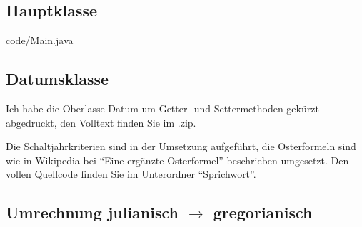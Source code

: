 \subsection{Hauptklasse}
 {code/Main.java}
\clearpage
\subsection{Datumsklasse}
Ich habe die Oberlasse Datum um Getter- und Settermethoden gekürzt abgedruckt, den Volltext finden Sie im .zip.



Die Schaltjahrkriterien sind in der Umsetzung aufgeführt, die Osterformeln sind wie in Wikipedia bei "`Eine ergänzte Osterformel"' beschrieben umgesetzt. Den vollen Quellcode finden Sie im Unterordner "`Sprichwort"'.
\clearpage
\subsection{Umrechnung julianisch \(\rightarrow\) gregorianisch}
